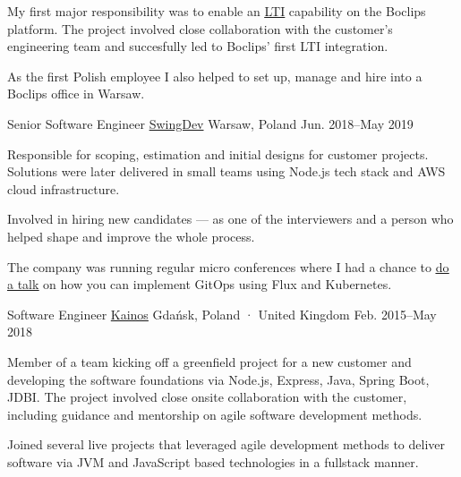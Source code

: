 \begin{cventries}
{{\begin{cvitems}
            \item {My first major responsibility was to enable an \href{https://www.imsglobal.org/activity/learning-tools-interoperability}{\underline{LTI}} capability on the Boclips platform. The project involved close collaboration with the customer's engineering team and succesfully led to Boclips' first LTI integration.}
            \item {As the first Polish employee I also helped to set up, manage and hire into a Boclips office in Warsaw.}
          \end{cvitems}
        }
    }

  \cventry
    {Senior Software Engineer} %
    {\href{https://www.swing.dev}{SwingDev}} %
    {Warsaw, Poland} %
    {Jun. 2018–May 2019} %
    {
      \begin {cvitems} %
        \item {Responsible for scoping, estimation and initial designs for customer projects. Solutions were later delivered in small teams using Node.js tech stack and AWS cloud infrastructure.}
        \item {Involved in hiring new candidates — as one of the interviewers and a person who helped shape and improve the whole process.}
        \item {The company was running regular micro conferences where I had a chance to \href{https://www.youtube.com/watch?v=5zt-jzKHwX8}{\underline{do a talk}} on how you can implement GitOps using Flux and Kubernetes.}
      \end {cvitems}
    }

  \cventry
    {Software Engineer} %
    {\href{https://www.kainos.com}{Kainos}} %
    {Gdańsk, Poland · United Kingdom} %
    {Feb. 2015–May 2018} %
    {
      \begin{cvitems} %
        \item {Member of a team kicking off a greenfield project for a new customer and developing the software foundations via Node.js, Express, Java, Spring Boot, JDBI. The project involved close onsite collaboration with the customer, including guidance and mentorship on agile software development methods.}
        \item {Joined several live projects that leveraged agile development methods to deliver software via JVM and JavaScript based technologies in a fullstack manner.}
      \end{cvitems}
    }


\end{cventries}
